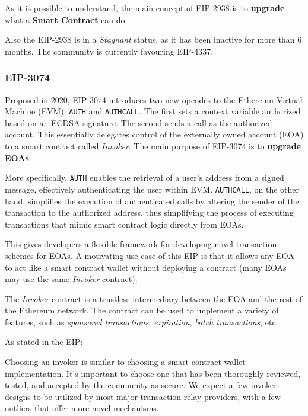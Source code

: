 As it is possible to understand, the main concept of EIP-2938 is to \textbf{upgrade} what a \textbf{Smart Contract} can do.

Also the EIP-2938 is in a \textit{Stagnant} status, as it has been inactive for more than 6 months. The community is currently favouring EIP-4337. \cite{ethereum-account-abstraction}

\subsubsection{EIP-3074}
\label{subsubsec:eip-3074}

Proposed in 2020, EIP-3074 introduces two new opcodes to the Ethereum Virtual Machine (EVM): \texttt{AUTH} and \texttt{AUTHCALL}. The first sets a context variable authorized based on an ECDSA signature. The second sends a call as the authorized account. This essentially delegates control of the externally owned account (EOA) to a smart contract called \textit{Invoker}. The main purpose of EIP-3074 is to \textbf{upgrade EOAs}. \cite{eip-3074}

More specifically, \texttt{AUTH} enables the retrieval of a user's address from a signed message, effectively authenticating the user within EVM. \texttt{AUTHCALL}, on the other hand, simplifies the execution of authenticated calls by altering the sender of the transaction to the authorized address, thus simplifying the process of executing transactions that mimic smart contract logic directly from EOAs. \cite{ethereum-account-abstraction}

This gives developers a flexible framework for developing novel transaction schemes for EOAs. A motivating use case of this EIP is that it allows any EOA to act like a smart contract wallet without deploying a contract (many EOAs may use the same \textit{Invoker} contract). \cite{eip-3074}

The \textit{Invoker} contract is a trustless intermediary between the EOA and the rest of the Ethereum network. The contract can be used to implement a variety of features, such as \textit{sponsored transactions}, \textit{expiration}, \textit{batch transactions}, etc. \cite{eip-3074}

As stated in the EIP: \cite{eip-3074}
\begin{displayquote}
    Choosing an invoker is similar to choosing a smart contract wallet implementation. It's important to choose one that has been thoroughly reviewed, tested, and accepted by the community as secure. We expect a few invoker designs to be utilized by most major transaction relay providers, with a few outliers that offer more novel mechanisms.
\end{displayquote}

